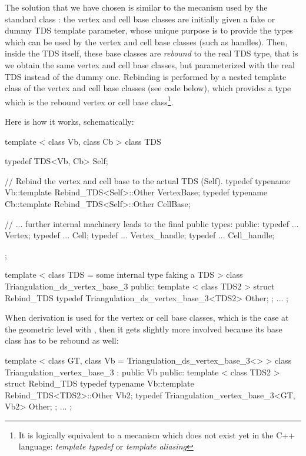 The solution that we have chosen is similar to the mecanism used by the
standard class : the vertex and cell base classes are
initially given a fake or dummy TDS template parameter, whose unique purpose
is to provide the types which can be used by the vertex and cell base classes
(such as handles).  Then, inside the TDS itself, these base classes are
\textit{rebound} to the real TDS type, that is we obtain the same vertex
and cell base classes, but parameterized with the real TDS instead of the dummy
one.  Rebinding is performed by a nested template class of the vertex and cell
base classes (see code below), which provides a type which is the rebound
vertex or cell base class\footnote{It is logically equivalent to a mecanism
which does not exist yet in the C++ language: \textit{template typedef} or
\textit{template aliasing}}.

Here is how it works, schematically:

\begin{ccExampleCode}
template < class Vb, class Cb >
class TDS
{
  typedef TDS<Vb, Cb>    Self;

  // Rebind the vertex and cell base to the actual TDS (Self).
  typedef typename Vb::template Rebind_TDS<Self>::Other  VertexBase;
  typedef typename Cb::template Rebind_TDS<Self>::Other  CellBase;

  // ... further internal machinery leads to the final public types:
public:
  typedef ...  Vertex;
  typedef ...  Cell;
  typedef ...  Vertex_handle;
  typedef ...  Cell_handle;
};

template < class TDS = some internal type faking a TDS >
class Triangulation_ds_vertex_base_3
{
public:
  template < class TDS2 >
  struct Rebind_TDS {
    typedef Triangulation_ds_vertex_base_3<TDS2>    Other;
  };
...
};
\end{ccExampleCode}

When derivation is used for the vertex or cell base classes, which is the
case at the geometric level with , then
it gets slightly more involved because its base class has to be rebound as
well:

\begin{ccExampleCode}
template < class GT, class Vb = Triangulation_ds_vertex_base_3<> >
class Triangulation_vertex_base_3 : public Vb
{
public:
  template < class TDS2 >
  struct Rebind_TDS {
    typedef typename Vb::template Rebind_TDS<TDS2>::Other  Vb2;
    typedef Triangulation_vertex_base_3<GT, Vb2>           Other;
  };
...
};
\end{ccExampleCode}

